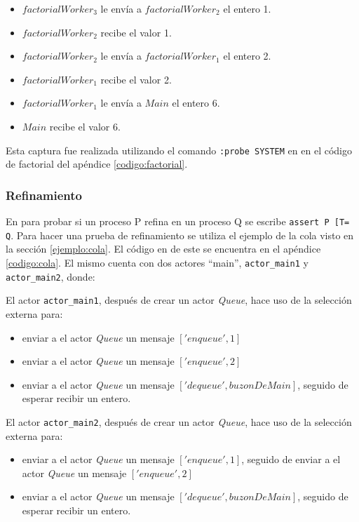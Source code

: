 \begin{itemize}
\item $factorialWorker_3$ le envía a $factorialWorker_2$ el entero 1.
\item $factorialWorker_2$ recibe el valor 1.

\item $factorialWorker_2$ le envía a $factorialWorker_1$ el entero 2.
\item $factorialWorker_1$ recibe el valor 2.

\item $factorialWorker_1$ le envía a $Main$ el entero 6.
\item $Main$ recibe el valor 6.

\end{itemize}

Esta captura fue realizada utilizando el comando \verb=:probe SYSTEM= en \FDR en el código de factorial del apéndice \ref{codigo:factorial}.

\subsubsection*{Refinamiento}

En \FDR para probar si un proceso P refina en un proceso Q se escribe \verb$assert P [T= Q$. Para hacer una prueba de refinamiento se utiliza el ejemplo de la cola visto en la sección \ref{ejemplo:cola}. El código en \CSPm de este se encuentra en el apéndice \ref{codigo:cola}. El mismo cuenta con dos actores ``main'', \verb=actor_main1= y \verb=actor_main2=, donde:

El actor \verb=actor_main1=, después de crear un actor \textit{Queue}, hace uso de la selección externa para:
\begin{itemize}
 \item enviar a el actor \textit{Queue} un mensaje $['enqueue', 1]$
 \item enviar a el actor \textit{Queue} un mensaje $['enqueue', 2]$
 \item enviar a el actor \textit{Queue} un mensaje $['dequeue', buzonDeMain]$, seguido de esperar recibir un entero.
\end{itemize}

El actor \verb=actor_main2=, después de crear un actor \textit{Queue}, hace uso de la selección externa para:
\begin{itemize}
 \item enviar a el actor \textit{Queue} un mensaje $['enqueue', 1]$, seguido de enviar a el actor \textit{Queue} un mensaje $['enqueue', 2]$
 \item enviar a el actor \textit{Queue} un mensaje $['dequeue', buzonDeMain]$, seguido de esperar recibir un entero.
\end{itemize}

